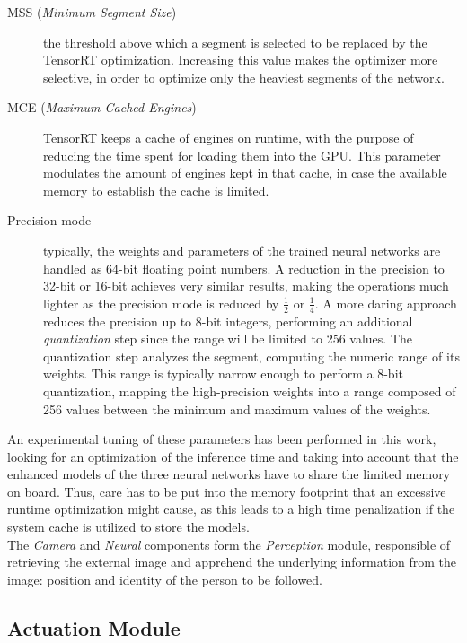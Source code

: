 \begin{description}
	\item[MSS (\textit{Minimum Segment Size})] the threshold above which a segment is selected to be replaced by the TensorRT optimization. Increasing this value makes the optimizer more selective, in order to optimize only the heaviest segments of the network. 
	\item[MCE (\textit{Maximum Cached Engines})] TensorRT keeps a cache of engines on runtime, with the purpose of reducing the time spent for loading them into the GPU. This parameter modulates the amount of engines kept in that cache, in case the available memory to establish the cache is limited.
	\item[Precision mode] typically, the weights and parameters of the trained neural networks are handled as 64-bit floating point numbers. A reduction in the precision to 32-bit or 16-bit achieves very similar results, making the operations much lighter as the precision mode is reduced by $\frac{1}{2}$ or $\frac{1}{4}$. A more daring approach reduces the precision up to 8-bit integers, performing an additional \textit{quantization} step since the range will be limited to 256 values. The quantization step analyzes the segment, computing the numeric range of its weights. This range is typically narrow enough to perform a 8-bit quantization, mapping the high-precision weights into a range composed of 256 values between the minimum and maximum values of the weights.
\end{description}

An experimental tuning of these parameters has been performed in this work, looking for an optimization of the inference time and taking into account that the enhanced models of the three neural networks have to share the limited memory on board. Thus, care has to be put into the memory footprint that an excessive runtime optimization might cause, as this leads to a high time penalization if the system cache is utilized to store the models.\\


The \textit{Camera} and \textit{Neural} components form the \textit{Perception} module, responsible of retrieving the external image and apprehend the underlying information from the image: position and identity of the person to be followed.


\subsection{Actuation Module}

